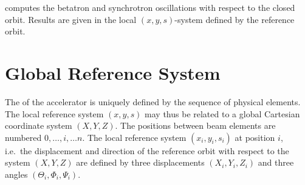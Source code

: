 \opalmap computes the betatron and synchrotron oscillations
with respect to the closed orbit.
Results are given in the local $(x, y, s)$-system
defined by the reference orbit.

\section{Global Reference System}

The  
of the accelerator is uniquely defined by the sequence of physical elements.
The local reference system $(x, y, s)$
may thus be related to a global Cartesian coordinate system $(X, Y, Z)$.
The positions between beam elements are numbered $0, \ldots , i, \ldots n$.
The local reference system $(x_i, y_i, s_i)$ at position $i$,
i.e.\ the displacement and direction of the reference orbit
with respect to the system $(X, Y, Z)$ are defined by three displacements 
$(X_i, Y_i, Z_i)$ and three angles $(\Theta_i, \Phi_i, \Psi_i)$.

